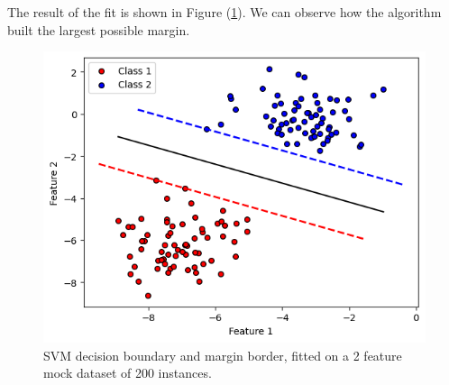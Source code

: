 \documentclass[a4paper]{article}
\begin{document}
The result of the fit is shown in Figure (\ref{fig:classical svm mock}). We can observe how the algorithm built the largest possible margin. 


\begin{figure}[h!]
    \centering
    \includegraphics[width=\textwidth]{images/classicalsvm.png}
    \caption{SVM decision boundary and margin border, fitted on a 2 feature mock dataset of 200 instances.}
    \label{fig:classical svm mock}
\end{figure}
\end{document}
